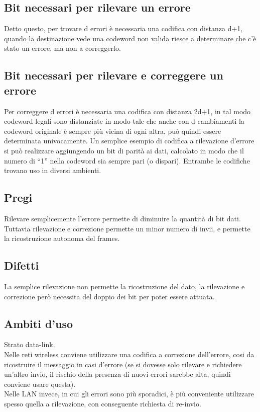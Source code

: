 \subsection{Bit necessari per rilevare un errore}
Detto questo, per trovare d errori è necessaria una codifica con distanza d+1,
quando la destinazione vede una codeword non valida riesce a determinare che c'è stato un errore, ma non a correggerlo.
\subsection{Bit necessari per rilevare e correggere un errore}
Per correggere d errori è necessaria una codifica con distanza 2d+1,
in tal modo codeword legali sono distanziate in modo tale che anche con d cambiamenti la codeword originale è sempre più vicina di ogni altra,
può quindi essere determinata univocamente.
Un semplice esempio di codifica a rilevazione d'errore si può realizzare aggiungendo un bit di parità ai dati,
calcolato in modo che il numero di “1” nella codeword sia sempre pari (o dispari).
Entrambe le codifiche trovano uso in diversi ambienti.

\subsection{Pregi}
Rilevare semplicemente l'errore permette di diminuire la quantità di bit dati.
Tuttavia rilevazione e correzione permette un minor numero di invii, e permette la ricostruzione autonoma del frames.

\subsection{Difetti}
La semplice rilevazione non permette la ricostruzione del dato, la rilevazione e correzione però necessita del doppio dei bit per poter essere attuata.

\subsection{Ambiti d'uso}
Strato data-link.\\
Nelle reti wireless conviene utilizzare una codifica a correzione dell'errore, cosi da ricostruire il messaggio in casi d'errore
(se si dovesse solo rilevare e richiedere un'altro invio, il rischio della presenza di nuovi errori sarebbe alta, quindi conviene usare questa).\\
Nelle LAN invece, in cui gli errori sono più sporadici, è più conveniente utilizzare spesso quella a rilevazione, con conseguente richiesta di re-invio.


